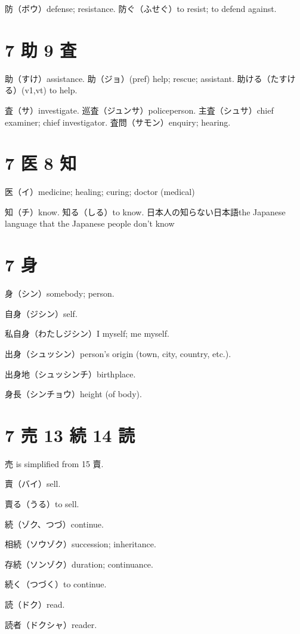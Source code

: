 防（ボウ）defense; resistance.
防ぐ（ふせぐ）to resist; to defend against.

\section{7 助 9 査}

助（すけ）assistance.
助（ジョ）(pref) help; rescue; assistant.
助ける（たすける）(v1,vt) to help.

査（サ）investigate.
巡査（ジュンサ）policeperson.
主査（シュサ）chief examiner; chief investigator.
査問（サモン）enquiry; hearing.

\section{7 医 8 知}

医（イ）medicine; healing; curing; doctor (medical)

知（チ）know.
知る（しる）to know.
日本人の知らない日本語the Japanese language that the Japanese people don't know

\section{7 身}

身（シン）somebody; person.

自身（ジシン）self.

私自身（わたしジシン）I myself; me myself.

出身（シュッシン）person's origin (town, city, country, etc.).

出身地（シュッシンチ）birthplace.

身長（シンチョウ）height (of body).

\section{7 売 13 続 14 読}

売 is simplified from 15 賣.

賣（バイ）sell.

賣る（うる）to sell.

続（ゾク、つづ）continue.

相続（ソウゾク）succession; inheritance.

存続（ソンゾク）duration; continuance.

続く（つづく）to continue.

読（ドク）read.

読者（ドクシャ）reader.

